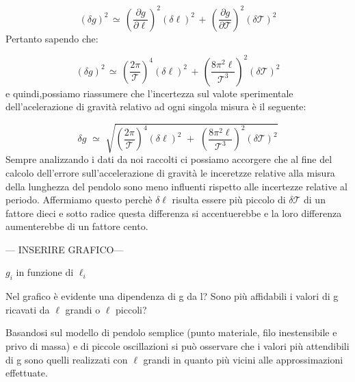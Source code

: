\begin{equation*}
(\delta g)^2 \, \simeq \, \left( \frac{\partial g}{\partial \ell} \right)^2 (\delta \ell)^2 \, + \, \left( \frac{\partial g}{\partial \mathcal{T}} \right)^2 (\delta \mathcal{T})^2
\end{equation*}
%
Pertanto sapendo che:

\begin{equation*}
(\delta g)^2 \, \simeq \, \left( \frac{2 \pi}{\mathcal{T}} \right)^4 (\delta \ell)^2 \, + \, \left( \frac{8 \pi^2 \ell}{\mathcal{T}^3} \right)^2 (\delta \mathcal{T})^2
\end{equation*}
%
e quindi,possiamo riassumere che l'incertezza sul valote sperimentale dell'acelerazione di gravità relativo ad ogni singola misura è il seguente:

\begin{equation} \label{eq:delta_g}
\delta g \,\, \simeq \,\, \sqrt{\left( \frac{2 \pi}{\mathcal{T}} \right)^4 (\delta \ell)^2 \,\, + \,\, \left( \frac{8 \pi^2 \ell}{\mathcal{T}^3} \right)^2 (\delta \mathcal{T})^2}
\end{equation}
%
Sempre analizzando i dati da noi raccolti ci possiamo accorgere che al fine del calcolo dell'errore sull'accelerazione di gravità le inceretzze relative alla misura della lunghezza del pendolo sono meno influenti rispetto alle incertezze relative al periodo. Affermiamo questo perchè $\delta \ell$ risulta essere più piccolo di $\delta \mathcal{T}$ di un fattore dieci e sotto radice questa differenza si accentuerebbe e la loro differenza aumenterebbe di un fattore cento.

\begin{center}
--- INSERIRE GRAFICO---

$g_i$ in funzione di $\ell_i$
\end{center}

Nel grafico è evidente una dipendenza di g da l? Sono più affidabili i valori di g ricavati da $\ell$ grandi o $\ell$ piccoli?

Basandosi sul modello di pendolo semplice (punto materiale, filo inestensibile e privo di massa) e di piccole oscillazioni si può osservare che i valori più attendibili di g sono quelli realizzati con $\ell$ grandi in quanto più vicini alle approssimazioni effettuate.
